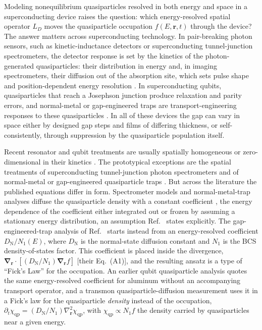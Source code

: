 \documentclass[
  aps,
  prb,
  preprint,
  superscriptaddress,
  longbibliography,
  nofootinbib
]{revtex4-2}
\newcommand{\br}{\mathbf{r}}
\newcommand{\bnabla}{\boldsymbol{\nabla}}
\newcommand{\DOS}{N_1}
\newcommand{\DN}{D_{\mathrm{N}}}
\newcommand{\LD}{L_D}
\newcommand{\qp}{\mathrm{qp}}
\begin{document}
Modeling nonequilibrium quasiparticles resolved in both energy and space in a
superconducting device raises the question:
which energy-resolved spatial operator \(\LD\) moves the quasiparticle
occupation \(f(E,\br,t)\) through the device? The answer matters
across superconducting technology. In pair-breaking photon
sensors, such as kinetic-inductance detectors or superconducting
tunnel-junction spectrometers, the detector response is set by the
kinetics of the photon-generated quasiparticles: their distribution in
energy \cite{goldie2013} and, in imaging spectrometers, their
diffusion out of the absorption site, which sets pulse shape and
position-dependent energy resolution \cite{kozorezov2002,segall2004}.
In superconducting qubits, quasiparticles that reach a Josephson
junction produce relaxation and parity errors, and normal-metal or
gap-engineered traps are transport-engineering responses to these
quasiparticles \cite{martinis2009,riwar2016,hosseinkhani2018,riwar2019,dong2022}. In
all of these devices the gap can vary in space either by designed gap steps and films of differing thickness, or
self-consistently, through suppression by the quasiparticle population
itself.

Recent resonator and
qubit treatments are usually spatially homogeneous or zero-dimensional
in their kinetics
\cite{goldie2013,catelani2019,fischer2023,fischer2024,marchegiani2025}.
The prototypical exceptions are the spatial treatments of superconducting tunnel-junction photon
spectrometers \cite{kozorezov2002,segall2004} and of normal-metal or
gap-engineered quasiparticle traps
\cite{riwar2016,hosseinkhani2018,riwar2019}. But across the literature the published equations differ
in form. Spectrometer models and normal-metal-trap analyses diffuse
the quasiparticle density with a constant coefficient
\cite{kozorezov2002,segall2004,riwar2016,hosseinkhani2018}, the energy
dependence of the coefficient either integrated out or frozen by
assuming a stationary energy distribution, an assumption
Ref.~ states explicitly. The
gap-engineered-trap analysis of Ref.~ starts
instead from an energy-resolved coefficient \(\DN/\DOS(E)\), where
\(\DN\) is the normal-state diffusion constant and \(\DOS\) is the BCS
density-of-states factor. This coefficient is placed inside the
divergence, \(\bnabla_{\br}\cdot[(\DN/\DOS)\bnabla_{\br}f]\) [their
Eq.~(A1)], and the
resulting ansatz is a type of ``Fick's Law'' for the occupation. An
earlier qubit quasiparticle analysis \cite{martinis2009} quotes the
same energy-resolved coefficient for aluminum without an accompanying
transport operator, and a transmon quasiparticle-diffusion measurement
\cite{dong2022} uses it in a Fick's law for the quasiparticle
\emph{density} instead of the occupation,
\(\partial_t\chi_{\qp}=(\DN/\DOS)\nabla_{\br}^{2}\chi_{\qp}\), with
\(\chi_{\qp}\propto\DOS f\) the density carried by quasiparticles near a given
energy.
\end{document}
